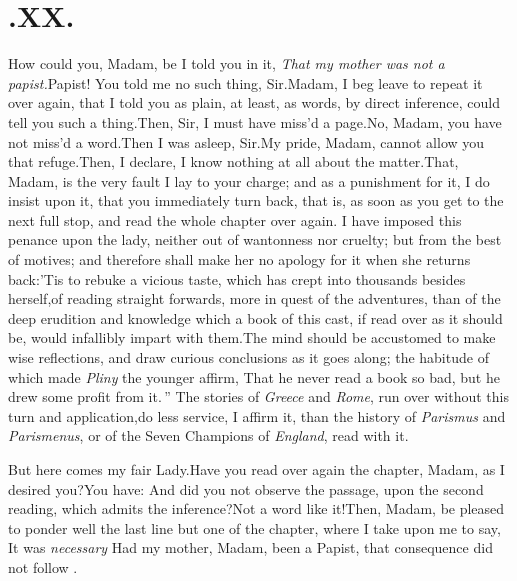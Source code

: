 \documentclass{article}
\begin{document}
\vskip 48pt
\newpage
\section{.\enspace XX.}

\qquad\tsh How could you, Madam, be\break
{}
I told you in it, \textit{That my mother was not a
papist.}\tsh  Papist! You told me no such thing,
Sir.\tsk  Madam, I beg leave to repeat it over again, that I told
you as plain, at least, as words, by direct inference, could tell
you such a thing.\tsk  Then, Sir, I must have miss’d a
page.\tsk  No, Madam, you have not miss’d a word.\tsk  Then
I was asleep, Sir.\tsk  My pride, Madam, cannot allow you that
refuge.\tsk  Then, I declare, I know nothing at all about the
matter.\tsk  That, Madam, is the very fault I lay to your charge;
and as a punishment for it, I do insist upon it, that you
immediately turn back, that is, as soon as you get to the next full
stop, and read the whole chapter over again. I have imposed this
penance upon the lady, neither out of wantonness nor cruelty; but
from the best of motives; and therefore shall make her no apology
for it when she returns back:\tsk  ’Tis to rebuke a vicious
taste, which has crept into thousands besides herself,\tsk  of
reading straight forwards, more in quest of the adventures, than of the deep erudition
and knowledge which a book of this cast, if read over as it should
be, would infallibly impart with them.\tsh  The mind should
be accustomed to make wise reflections, and draw curious
conclusions as it goes along; the habitude of which made
\textit{Pliny} the younger affirm, \lqq That he never read a
book so bad, but he drew some profit from it.\,” The stories of
\textit{Greece} and \textit{Rome}, run over without this turn and
application,\tsk  do less service, I affirm it, than the history
of \textit{Parismus} and \textit{Parismenus}, or of the Seven Champions
of \textit{England}, read with it.

\tsh  But here comes my fair Lady.\break Have you read over again the
chapter, Madam, as I desired you?\tsk  You have: And did you not observe the
passage, upon the second reading, which admits the inference?\tsk  Not a word
like it!\break Then, Madam, be pleased to ponder well the last line but one of the
chapter, where I take upon me to say, \lqq It was \textit{necessary}
Had my mother, Madam, been a
Papist, that consequence did not follow \fnast.\\
\end{document}
